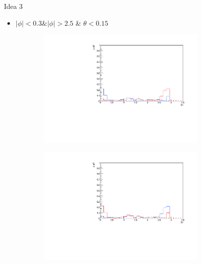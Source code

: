 \documentclass[11pt]{beamer}
\begin{document}
\begin{frame}{Idea 3}
\begin{itemize}
\item $|\phi| < 0.3 \& |\phi| > 2.5$ \& $\theta < 0.15$
\end{itemize}
\begin{figure}
\begin{subfigure}{0.45\textwidth}
\includegraphics[width=0.9\textwidth]{first/up_pdf/test_u/h_phi_test_SPi_combined.pdf}
\end{subfigure}
\begin{subfigure}{0.45\textwidth}
\includegraphics[width=0.9\textwidth]{first/down_pdf/test_d/h_phi_test_SPi_combined.pdf}
\end{subfigure}
\end{figure}
\end{frame}
\end{document}
